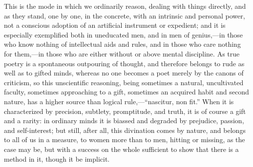 This is the mode in which we ordinarily reason, dealing with things
directly, and as they stand, one by one, in the concrete, with an
intrinsic and personal power, not a conscious adoption of an
artificial instrument or expedient; and it is especially exemplified
both in uneducated men, and in men of genius,—in those who know
nothing of intellectual aids and rules, and in those who care nothing
for them,—in those who are either without or above mental
discipline. As true poetry is a spontaneous outpouring of thought, and
therefore belongs to rude as well as to gifted minds, whereas no one
becomes a poet merely by the canons of criticism, so this unscientific
reasoning, being sometimes a natural, uncultivated faculty, sometimes
approaching to a gift, sometimes an acquired habit and second nature,
has a higher source than logical rule,—``nascitur, non
fit.'' When it is characterized by precision, subtlety, promptitude,
and truth, it is of course a gift and a rarity: in ordinary minds it
is biassed and degraded by prejudice, passion, and self-interest; but
still, after all, this divination comes by nature, and belongs to all
of us in a measure, to women more than to men, hitting or missing, as
the case may be, but with a success on the whole sufficient to show
that there is a method in it, though it be implicit.

